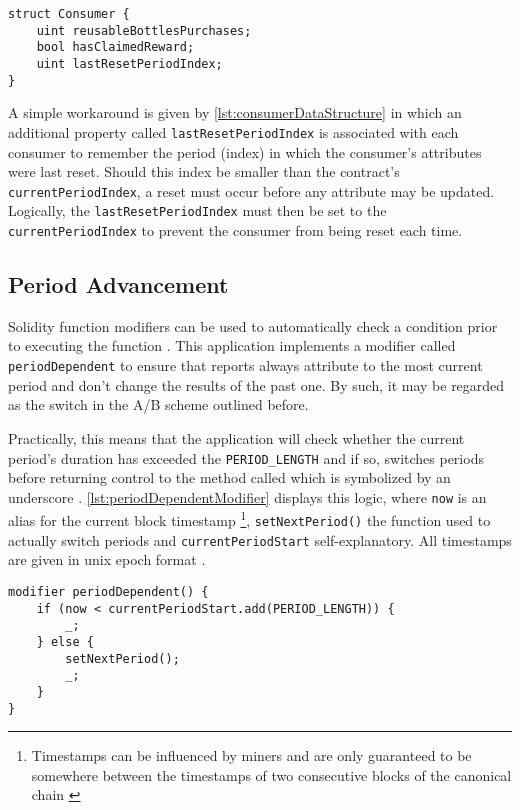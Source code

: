 \begin{lstlisting}[language=Solidity, caption=Consumer data structure, label=lst:consumerDataStructure]
struct Consumer {
	uint reusableBottlesPurchases;
	bool hasClaimedReward;
	uint lastResetPeriodIndex;
}
\end{lstlisting}

A simple workaround is given by \autoref{lst:consumerDataStructure} in which an additional property called \texttt{lastResetPeriodIndex} is associated with each consumer to remember the period (index) in which the consumer's attributes were last reset. Should this index be smaller than the contract's \texttt{currentPeriodIndex}, a reset must occur before any attribute may be updated. Logically, the \texttt{lastResetPeriodIndex} must then be set to the \texttt{currentPeriodIndex} to prevent the consumer from being reset each time.

\subsection{Period Advancement}
Solidity function modifiers can be used to automatically check a condition prior to executing the function \cite[p.~79]{solidityDocs}. This application implements a modifier called \texttt{periodDependent} to ensure that reports always attribute to the most current period and don't change the results of the past one. By such, it may be regarded as the switch in the A/B scheme outlined before.

Practically, this means that the application will check whether the current period's duration has exceeded the \texttt{PERIOD\_LENGTH} and if so, switches periods before returning control to the method called which is symbolized by an underscore \cite[p.~81]{solidityDocs}. \autoref{lst:periodDependentModifier} displays this logic, where \texttt{now} is an alias for the current block timestamp \footnote{Timestamps can be influenced by miners and are only guaranteed to be somewhere between the timestamps of two consecutive blocks of the canonical chain \cite[p.~65]{solidityDocs}}, \texttt{setNextPeriod()} the function used to actually switch periods and \texttt{currentPeriodStart} self-explanatory. All timestamps are given in unix epoch format \cite[p.~29]{solidityDocs}. 

\begin{lstlisting}[language=Solidity, caption=Function modifier to advance period, label=lst:periodDependentModifier]
modifier periodDependent() {	
	if (now < currentPeriodStart.add(PERIOD_LENGTH)) {
		_;
	} else {
		setNextPeriod();
		_;
	}
}
\end{lstlisting}

